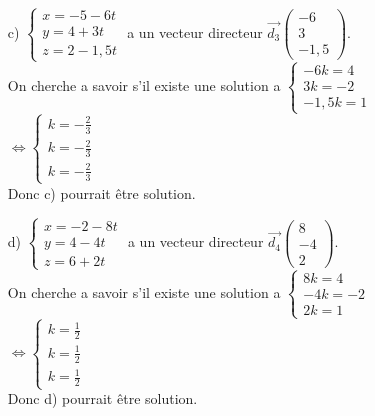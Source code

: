 \documentclass[a4paper, 12pt]{article}
\begin{document}
\begin{itemize}
    \item[c)] $\begin{cases} x = -5 - 6t \\ y = 4 + 3t \\ z = 2-1,5t \end{cases}$ a un vecteur directeur $\vec{d_3}\begin{pmatrix} -6 \\ 3 \\ -1,5 \end{pmatrix}$. 
        \\On cherche a savoir s'il existe une solution a $\begin{cases} -6k = 4 \\ 3k = -2 \\ -1,5k = 1 \end{cases}$
        \\
        $\iff \begin{cases} k = -\frac{2}{3} \\ k = -\frac{2}{3} \\k = -\frac{2}{3} \end{cases}$ 
        \\Donc c) pourrait être solution. \vspace{5mm}
    \item[d)] $\begin{cases} x = -2 - 8t \\ y = 4 - 4t \\ z = 6 + 2t \end{cases}$ a un vecteur directeur $\vec{d_4}\begin{pmatrix} 8 \\ -4 \\ 2 \end{pmatrix}$. 
        \\On cherche a savoir s'il existe une solution a $\begin{cases} 8k = 4 \\-4k = -2 \\ 2k = 1 \end{cases}$
        \\
        $\iff \begin{cases} k = \frac{1}{2} \\ k = \frac{1}{2} \\k = \frac{1}{2} \end{cases}$
        \\Donc d) pourrait être solution. \vspace{5mm}
\end{itemize}
\end{document}
